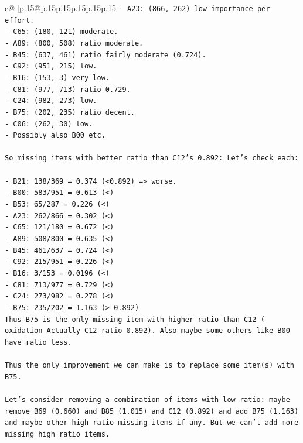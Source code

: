 \documentclass{article}
\begin{document}
{\begin{supertabular}{c@{$\;$}|p{.15\linewidth}@{}p{.15\linewidth}p{.15\linewidth}p{.15\linewidth}p{.15\linewidth}p{.15\linewidth}}
{{{\texttt{{-} A23: (866, 262) low importance per effort.} \\
\texttt{{-} C65: (180, 121) moderate.} \\
\texttt{{-} A89: (800, 508) ratio moderate.} \\
\texttt{{-} B45: (637, 461) ratio fairly moderate (0.724).} \\
\texttt{{-} C92: (951, 215) low.} \\
\texttt{{-} B16: (153, 3) very low.} \\
\texttt{{-} C81: (977, 713) ratio 0.729.} \\
\texttt{{-} C24: (982, 273) low.} \\
\texttt{{-} B75: (202, 235) ratio decent.} \\
\texttt{{-} C06: (262, 30) low.} \\
\texttt{{-} Possibly also B00 etc.} \\
\\ 
\texttt{So missing items with better ratio than C12's 0.892: Let's check each:} \\
\\ 
\texttt{{-} B21: 138/369 = 0.374 (<0.892) => worse.} \\
\texttt{{-} B00: 583/951 = 0.613 (<)} \\
\texttt{{-} B53: 65/287 = 0.226 (<)} \\
\texttt{{-} A23: 262/866 = 0.302 (<)} \\
\texttt{{-} C65: 121/180 = 0.672 (<)} \\
\texttt{{-} A89: 508/800 = 0.635 (<)} \\
\texttt{{-} B45: 461/637 = 0.724 (<)} \\
\texttt{{-} C92: 215/951 = 0.226 (<)} \\
\texttt{{-} B16: 3/153 = 0.0196 (<)} \\
\texttt{{-} C81: 713/977 = 0.729 (<)} \\
\texttt{{-} C24: 273/982 = 0.278 (<)} \\
\texttt{{-} B75: 235/202 = 1.163 (> 0.892)} \\
\texttt{Thus B75 is the only missing item with higher ratio than C12 ( oxidation Actually C12 ratio 0.892). Also maybe some others like B00 have ratio less.} \\
\\ 
\texttt{Thus the only improvement we can make is to replace some item(s) with B75.} \\
\\ 
\texttt{Let's consider removing a combination of items with low ratio: maybe remove B69 (0.660) and B85 (1.015) and C12 (0.892) and add B75 (1.163) and maybe other high ratio missing items if any. But we can't add more missing high ratio items.} \\
}}}
\end{supertabular}}
\end{document}
